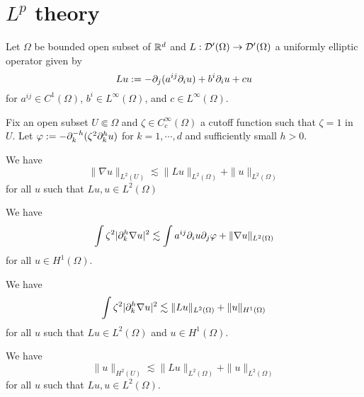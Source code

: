 \documentclass{../note}
\begin{document}
\section{$L^p$ theory}
\begin{prb}
Let $\Omega$ be bounded open subset of $\mathbb{R}^d$ and $L:\mathcal{D}'(\Omega)\to\mathcal{D}'(\Omega)$ a uniformly elliptic operator given by
\[Lu:=-\pd_j(a^{ij}\pd_iu)+b^i\pd_iu+cu\]
for $a^{ij}\in C^1(\Omega)$, $b^i\in L^\infty(\Omega)$, and $c\in L^\infty(\Omega)$.

Fix an open subset $U\Subset\Omega$ and $\zeta\in C_c^\infty(\Omega)$ a cutoff function such that $\zeta=1$ in $U$.
Let $\f:=-\pd_k^{-h}(\zeta^2\pd_k^hu)$ for $k=1,\cdots,d$ and sufficiently small $h>0$.
\begin{parts}
\item We have
\[\|\nabla u\|_{L^2(U)}\lesssim\|Lu\|_{L^2(\Omega)}+\|u\|_{L^2(\Omega)}\]
for all $u$ such that $Lu,u\in L^2(\Omega)$
\item We have
\[\int\zeta^2|\pd_k^h\nabla u|^2\lesssim\int a^{ij}\pd_iu\pd_j\f+\|\nabla u\|_{L^2(\Omega)}\]
for all $u\in H^1(\Omega)$.
\item We have
\[\int\zeta^2|\pd_k^h\nabla u|^2\lesssim\|Lu\|_{L^2(\Omega)}+\|u\|_{H^1(\Omega)}\]
for all $u$ such that $Lu\in L^2(\Omega)$ and $u\in H^1(\Omega)$.
\item We have
\[\|u\|_{H^2(U)}\lesssim\|Lu\|_{L^2(\Omega)}+\|u\|_{L^2(\Omega)}\]
for all $u$ such that  $Lu,u\in L^2(\Omega)$.
\end{parts}
\end{prb}
\end{document}
